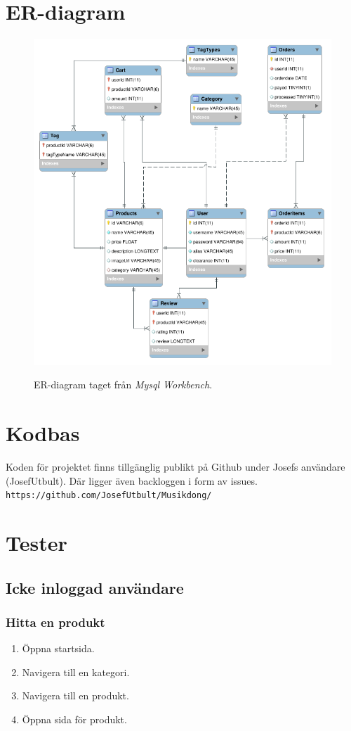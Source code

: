 \documentclass[a4paper]{article}
\begin{document}
\section{ER-diagram}
\begin{figure}[H]
\includegraphics[width=\textwidth,height=\textheight,keepaspectratio]{ER.png}
\caption \newline ER-diagram taget från \textit{Mysql Workbench}.
\centering
\end{figure}
%
\section{Kodbas}
Koden för projektet finns tillgänglig publikt på Github under Josefs användare (JosefUtbult). Där ligger även backloggen i form av issues. \\
\texttt{https://github.com/JosefUtbult/Musikdong/}
%
\section{Tester}
\subsection{Icke inloggad användare}
\subsubsection{Hitta en produkt}
\begin{enumerate}
  \item Öppna startsida.
  \item Navigera till en kategori.
  \item Navigera till en produkt.
  \item Öppna sida för produkt.
\end{enumerate}
%
\end{document}
